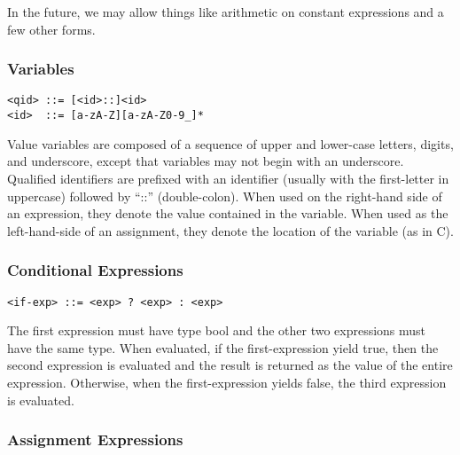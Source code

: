 \documentclass[titlepage,10pt]{article}
\begin{document}
In the future, we may allow things like arithmetic on constant
expressions and a few other forms.

\subsubsection{Variables}


\begin{verbatim}
<qid> ::= [<id>::]<id>
<id>  ::= [a-zA-Z][a-zA-Z0-9_]*
\end{verbatim}

Value variables are composed of a sequence of upper and lower-case
letters, digits, and underscore, except that variables may not begin
with an underscore.  Qualified identifiers are prefixed with an
identifier (usually with the first-letter in uppercase) followed by
``::'' (double-colon).   When used on the right-hand side of an
expression, they denote the value contained in the variable.  When used
as the left-hand-side of an assignment, they denote the location of the
variable (as in C).

\subsubsection{Conditional Expressions}


\begin{verbatim}
<if-exp> ::= <exp> ? <exp> : <exp>
\end{verbatim}

The first expression must have type bool and the other two expressions
must have the same type.  When evaluated, if the first-expression yield
true, then the second expression is evaluated and the result is returned
as the value of the entire expression.  Otherwise, when the
first-expression yields false, the third expression is evaluated.

\subsubsection{Assignment Expressions}
\end{document}
